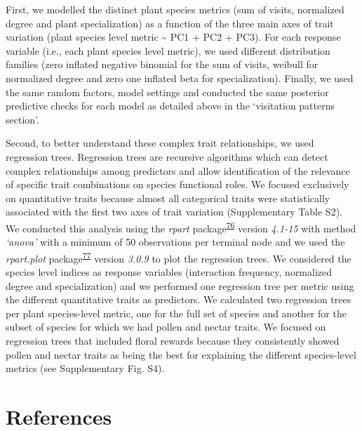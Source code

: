 \documentclass[
  12pt,
  a4paper,
]{article}
\begin{document}
First, we modelled the distinct plant species metrics (sum of visits, normalized degree and plant specialization) as a function of the three main axes of trait variation (plant species level metric \textasciitilde{} PC1 + PC2 + PC3). For each response variable (i.e., each plant species level metric), we used different distribution families (zero inflated negative binomial for the sum of visits, weibull for normalized degree and zero one inflated beta for specialization). Finally, we used the same random factors, model settings and conducted the same posterior predictive checks for each model as detailed above in the `visitation patterns section'.

Second, to better understand these complex trait relationships, we used regression trees. Regression trees are recursive algorithms which can detect complex relationships among predictors and allow identification of the relevance of specific trait combinations on species functional roles. We focused exclusively on quantitative traits because almost all categorical traits were statistically associated with the first two axes of trait variation (Supplementary Table S2). We conducted this analysis using the \emph{rpart} package\textsuperscript{\protect\hyperlink{ref-therneau2015}{76}} version \emph{4.1-15} with method \emph{`anova'} with a minimum of 50 observations per terminal node and we used the \emph{rpart.plot} package\textsuperscript{\protect\hyperlink{ref-milborrow2015}{77}} version \emph{3.0.9} to plot the regression trees. We considered the species level indices as response variables (interaction frequency, normalized degree and specialization) and we performed one regression tree per metric using the different quantitative traits as predictors. We calculated two regression trees per plant species-level metric, one for the full set of species and another for the subset of species for which we had pollen and nectar traits. We focused on regression trees that included floral rewards because they consistently showed pollen and nectar traits as being the best for explaining the different species-level metrics (see Supplementary Fig. S4).

\hypertarget{references}{%
\section{References}\label{references}}
\end{document}
